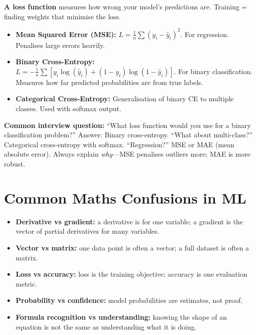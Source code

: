 \documentclass[12pt, a4paper, oneside]{book}
\begin{document}
\textbf{A loss function} measures how wrong your model's predictions are. Training = finding weights that minimise the loss.

\begin{itemize}[leftmargin=2em]
    \item \textbf{Mean Squared Error (MSE):} $L = \frac{1}{n}\sum(y_i - \hat{y}_i)^2$. For regression. Penalises large errors heavily.
    \item \textbf{Binary Cross-Entropy:} $L = -\frac{1}{n}\sum[y_i \log(\hat{y}_i) + (1-y_i)\log(1-\hat{y}_i)]$. For binary classification. Measures how far predicted probabilities are from true labels.
    \item \textbf{Categorical Cross-Entropy:} Generalisation of binary CE to multiple classes. Used with softmax output.
\end{itemize}

\begin{interviewbox}
\textbf{Common interview question:} ``What loss function would you use for a binary classification problem?'' Answer: Binary cross-entropy. ``What about multi-class?'' Categorical cross-entropy with softmax. ``Regression?'' MSE or MAE (mean absolute error). Always explain \emph{why}---MSE penalises outliers more; MAE is more robust.
\end{interviewbox}

\section{Common Maths Confusions in ML}

\begin{itemize}[leftmargin=2em]
    \item \textbf{Derivative vs gradient:} a derivative is for one variable; a gradient is the vector of partial derivatives for many variables.
    \item \textbf{Vector vs matrix:} one data point is often a vector; a full dataset is often a matrix.
    \item \textbf{Loss vs accuracy:} loss is the training objective; accuracy is one evaluation metric.
    \item \textbf{Probability vs confidence:} model probabilities are estimates, not proof.
    \item \textbf{Formula recognition vs understanding:} knowing the shape of an equation is not the same as understanding what it is doing.
\end{itemize}
\end{document}
